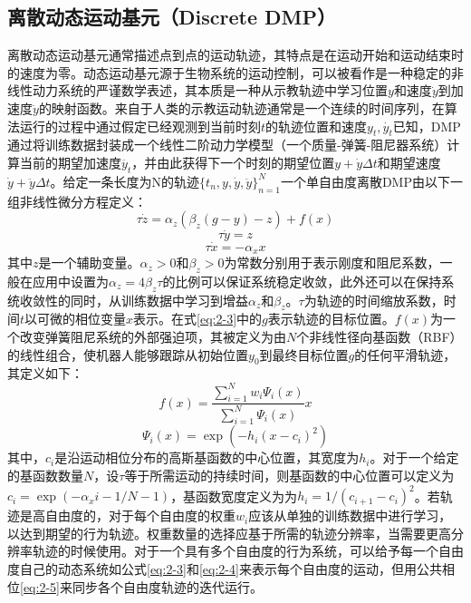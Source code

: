 \subsection{离散动态运动基元（Discrete DMP）}
离散动态运动基元通常描述点到点的运动轨迹，其特点是在运动开始和运动结束时的速度为零。动态运动基元源于生物系统的运动控制，可以被看作是一种稳定的非线性动力系统的严谨数学表述，其本质是一种从示教轨迹中学习位置$y$和速度$\dot{y}$到加速度$\ddot{y}$的映射函数。来自于人类的示教运动轨迹通常是一个连续的时间序列，在算法运行的过程中通过假定已经观测到当前时刻$t$的轨迹位置和速度${y_t,\dot{y_t}}$已知，DMP通过将训练数据封装成一个线性二阶动力学模型（一个质量-弹簧-阻尼器系统）计算当前的期望加速度$\ddot{y_t}$，并由此获得下一个时刻的期望位置$y+\dot{y}\Delta t$和期望速度$\dot{y}+\ddot{y}\Delta t$\cite{HuangJiQiRenYunDongGuiJiDeMoFangXueXiZongShu}。给定一条长度为N的轨迹$\{ t_n,y,\dot{y},\ddot{y} \}_{n=1}^N$一个单自由度离散DMP由以下一组非线性微分方程定义：
\begin{equation}
    \tau \dot{z}=\alpha_z\left(\beta_z(g-y)-z\right)+f(x)
    \label{eq:2-3}
\end{equation}
\begin{equation}
    \tau \dot{y}=z 
    \label{eq:2-4}
\end{equation}
\begin{equation}
    \tau \dot{x}=-\alpha_x x
    \label{eq:2-5}
\end{equation}
其中$z$是一个辅助变量。$α_z>0$和$β_z>0$为常数分别用于表示刚度和阻尼系数，一般在应用中设置为$α_z=4β_z$$\tau$的比例可以保证系统稳定收敛，此外还可以在保持系统收敛性的同时，从训练数据中学习到增益$α_z$和$β_z$\cite{tanApplyingAdaptiveControlb}。$\tau$为轨迹的时间缩放系数，时间$t$以可微的相位变量$x$表示。在式\ref{eq:2-3}中的$g$表示轨迹的目标位置。$f(x)$为一个改变弹簧阻尼系统的外部强迫项，其被定义为由$N$个非线性径向基函数（RBF）的线性组合，使机器人能够跟踪从初始位置$y_0$到最终目标位置$g$的任何平滑轨迹，其定义如下：
\begin{equation}
    f(x)=\frac{\sum_{i=1}^N w_i \Psi_i(x)}{\sum_{i=1}^N \Psi_i(x)} x
    \label{eq:2-6}
\end{equation}
\begin{equation}
    \Psi_i(x)=\exp \left(-h_i\left(x-c_i\right)^2\right)
    \label{eq:2-7}
\end{equation}
其中，$c_i$是沿运动相位分布的高斯基函数的中心位置，其宽度为$h_i$。对于一个给定的基函数数量$N$，设$τ$等于所需运动的持续时间，则基函数的中心位置可以定义为$c_i=\exp \left(-\alpha_x i-1 / N-1\right)$，基函数宽度定义为为$h_i=1 /\left(c_{i+1}-c_i\right)^2$。若轨迹是高自由度的，对于每个自由度的权重$w_i$应该从单独的训练数据中进行学习，以达到期望的行为轨迹。权重数量的选择应基于所需的轨迹分辨率，当需要更高分辨率轨迹的时候使用。对于一个具有多个自由度的行为系统，可以给予每一个自由度自己的动态系统如公式\ref{eq:2-3}和\ref{eq:2-4}来表示每个自由度的运动，但用公共相位\ref{eq:2-5}来同步各个自由度轨迹的迭代运行。

